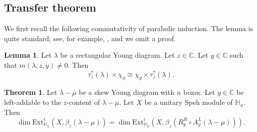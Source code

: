 \documentclass[11pt]{amsart}
\numberwithin{equation}{section}
\theoremstyle{definition}
\newtheorem{theorem}[thm]{Theorem}
\newtheorem{lemma}[thm]{Lemma}
\newtheorem{proposition}[thm]{Proposition}
\newtheorem{remark}[thm]{Remark}
\begin{document}








\subsection{Transfer theorem}

We first recall the following commutativity of parabolic induction. The lemma is quite standard; see, for example, \cite[Lemma 9.1]{chanhomobranch}, and we omit a proof. 

\begin{lemma}  \label{lem commute speh}
Let $\lambda$ be a rectangular Young diagram. Let $z\in \mathbb C$. Let $y \in \mathbb C$ such that $m(\lambda, z, y)\neq 0$. Then 
\[      \tau^*_z(\lambda) \times \chi_y \cong \chi_y \times \tau_z^*(\lambda) . \]
\end{lemma}




\begin{theorem} \label{thm transform one step calibrate}
Let $\lambda-\mu$ be a skew Young diagram with $n$ boxes. Let $y\in \mathbb C$ be left-addable to the $z$-content of $\lambda-\mu$. Let $X$ be a unitary Speh module of $\mathbb H_n$. Then 
\[  \dim \mathrm{Ext}^i_{\mathbb H_n}(X, \beta_z(\lambda-\mu)) = \dim \mathrm{Ext}^i_{\mathbb H_n}(X, \beta_z(R^R_y\circ A^L_y(\lambda-\mu))).
\]
\end{theorem}
\end{document}
